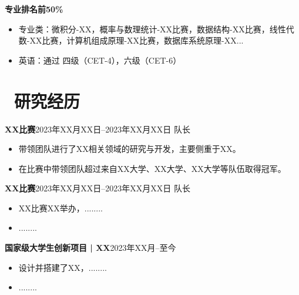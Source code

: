 \documentclass[11pt]{article}
\begin{document}
 {\bf 专业排名前50\%}
\begin{itemize}[parsep=0.5ex]
    \item 专业类：微积分-XX，概率与数理统计-XX比赛，数据结构-XX比赛，线性代数-XX比赛，计算机组成原理-XX比赛，数据库系统原理-XX...
    \item 英语：通过 四级（CET-4），六级（CET-6）

\end{itemize}

\section{\texorpdfstring{\makebox[\widthof{\faUniversity}][c]{\color{ZZU_BLUE}\faUniversity}\ 研究经历}{研究经历}}
 {\bf XX比赛}\hfill 2023年XX月XX日\hspace{0.5em}--\hspace{0.5em}2023年XX月XX日
\newline
队长
\begin{itemize}
    \item {带领团队进行了XX相关领域的研究与开发，主要侧重于XX。}
    \item {在比赛中带领团队超过来自XX大学、XX大学、XX大学等队伍取得冠军。}
\end{itemize}

{\bf XX比赛}\hfill 2023年XX月XX日\hspace{0.5em}--\hspace{0.5em}2023年XX月XX日
\newline
队长
\begin{itemize}
    \item {XX比赛XX举办，........}
    \item {........}
\end{itemize}

{\bf 国家级大学生创新项目\hspace{0.2em} | \hspace{0.2em}XX}\hfill 2023年XX月\hspace{0.5em}--\hspace{0.5em}至今
\begin{itemize}
    \item {设计并搭建了XX，........}
    \item {........}
\end{itemize}
\end{document}
